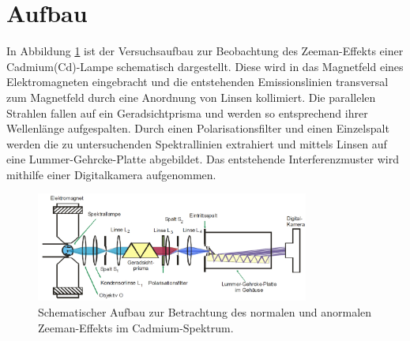 \section{Aufbau}
\label{sec:Aufbau}

In Abbildung \ref{fig:schema} ist der Versuchsaufbau zur Beobachtung des Zeeman-Effekts einer Cadmium(Cd)-Lampe schematisch dargestellt.
Diese wird in das Magnetfeld eines Elektromagneten eingebracht und die entstehenden Emissionslinien transversal zum Magnetfeld durch eine Anordnung von Linsen kollimiert. Die parallelen Strahlen fallen auf ein Geradsichtprisma und werden so entsprechend ihrer Wellenlänge aufgespalten. Durch einen Polarisationsfilter und einen Einzelspalt werden die zu untersuchenden Spektrallinien extrahiert und mittels Linsen auf eine Lummer-Gehrcke-Platte abgebildet. Das entstehende Interferenzmuster wird mithilfe einer Digitalkamera aufgenommen.

\begin{figure}
\centering
\includegraphics[width=0.8\textwidth]{content/images/schema.pdf}
\caption{Schematischer Aufbau zur Betrachtung des normalen und anormalen Zeeman-Effekts im Cadmium-Spektrum.\cite{V27}}
\label{fig:schema}
\end{figure}

